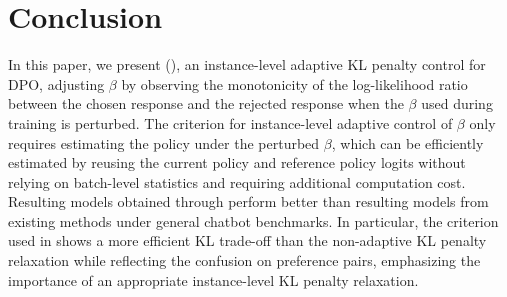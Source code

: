 \section{Conclusion}

In this paper, we present \methodfull{} (\method{}), an instance-level adaptive KL penalty control for DPO, adjusting $\beta$ by observing the monotonicity of the log-likelihood ratio between the chosen response and the rejected response when the $\beta$ used during training is perturbed. The criterion for instance-level adaptive control of $\beta$ only requires estimating the policy under the perturbed $\beta$, which can be efficiently estimated by reusing the current policy and reference policy logits without relying on batch-level statistics and requiring additional computation cost. Resulting models obtained through \method{} perform better than resulting models from existing methods under general chatbot benchmarks. In particular, the criterion used in \method{} shows a more efficient KL trade-off than the non-adaptive KL penalty relaxation while reflecting the confusion on preference pairs, emphasizing the importance of an appropriate instance-level KL penalty relaxation.